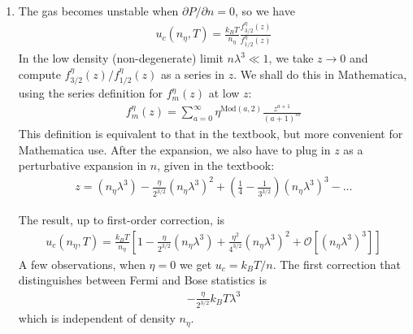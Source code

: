 \documentclass{article}
\theoremstyle{definition}
\newcommand{\p}{\partial}
\newcommand{\f}[2]{\frac{#1}{#2}}
\newcommand{\lp}{\left(}
\newcommand{\rp}{\right)}
\newcommand{\lb}{\left[}
\newcommand{\rb}{\right]}
\begin{document}
\begin{enumerate}[label=(\alph*)]
	Mathematica code:
	\begin{lstlisting}
	(*define f*)
	In[49]:= F[\[Eta]_, m_, z_] := (1/Factorial[m - 1])*
	Integrate[x^(m - 1)/(z^(-1)*Exp[x] - \[Eta]), {x, 0, Infinity}]
	
	(*find ratio*)
	In[52]:= D[F[\[Eta], 5/2, z], z]/D[F[\[Eta], 3/2, z], z]
	
	Out[52]= PolyLog[3/2, z \[Eta]]/PolyLog[1/2, z \[Eta]]
	
	(*find second ratio*)
	In[53]:= F[\[Eta], 3/2, z]/F[\[Eta], 1/2, z]
	
	Out[53]= PolyLog[3/2, z \[Eta]]/PolyLog[1/2, z \[Eta]]
	\end{lstlisting}
	
	
	\item The gas becomes unstable when $\p P / \p n = 0$, so we have
	\begin{align*}
	u_c(n_\eta,T) = \f{k_B T}{n_\eta}\f{f^\eta_{3/2}(z)}{f^\eta_{1/2}(z)}
	\end{align*}
	In the low density (non-degenerate) limit $n\lambda^3 \ll 1$, we take $z\to 0$ and compute $f^\eta_{3/2}(z)/f^{\eta}_{1/2}(z)$ as a series in $z$. We shall do this in Mathematica, using the series definition for $f^\eta_m(z)$ at low $z$:
	\begin{align*}
	f^\eta_m(z) = \sum_{a = 0}^\infty \eta^{\text{Mod}(a,2)} \f{z^{a+1}}{(a+1)^m}
	\end{align*} 
	This definition is equivalent to that in the textbook, but more convenient for Mathematica use.  After the expansion, we also have to plug in $z$ as a perturbative expansion in $n$, given in the textbook:
	\begin{align*}
	z = \lp n_\eta \lambda^3 \rp - \f{\eta}{2^{3/2}}\lp n_\eta \lambda^3 \rp^2 + \lp \f{1}{4} - \f{1}{3^{3/2}}  \rp \lp n_\eta \lambda^3 \rp^3 - \dots
	\end{align*}
	
	
	The result, up to first-order correction, is
	\begin{align*}
	\boxed{u_c(n_\eta,T) = \f{k_B T}{n_\eta}\lb  1   - \f{\eta}{2^{3/2}}\lp n_\eta\lambda^3\rp + \f{\eta^2}{4^{3/2}}(n_\eta\lambda^3)^2  + \mathcal{O}\left[(n_\eta\lambda^3)^3\right]\rb}
	\end{align*}
	A few observations, when $\eta = 0$ we get $u_c = k_B T /n$. The first correction that distinguishes between Fermi and Bose statistics is 
	\begin{align*}
	-\f{\eta}{2^{3/2}}k_BT\lambda^3
	\end{align*}
	which is independent of density $n_\eta$.\\
	

\end{enumerate}
\end{document}

